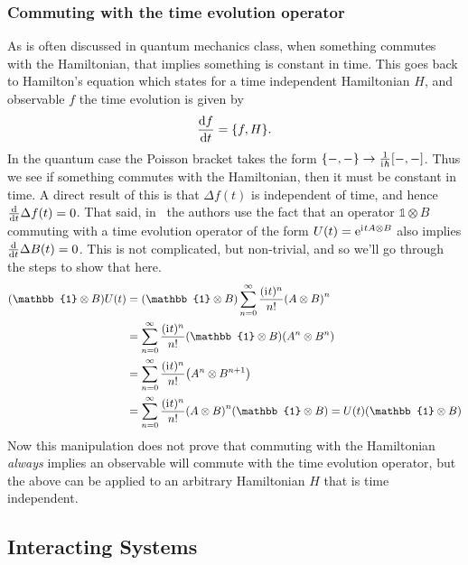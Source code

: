 \documentclass[11pt]{article}
\theoremstyle{definition}
\newcommand{\iu}{\mathrm{i}\mkern1mu}
\newcommand{\e}{\mathrm{e}}
\begin{document}
\subsubsection{Commuting with the time evolution operator}
As is often discussed in quantum mechanics class, when something commutes with the Hamiltonian, that implies something is constant in time. This goes back to Hamilton's equation which states for a time independent Hamiltonian $H$, and observable $f$ the time evolution is given by
\begin{equation*}
	\dv{f}{t} = \pb{f}{H}.
\end{equation*}
In the quantum case the Poisson bracket takes the form $\pb{-}{-}\to\frac{1}{\iu\hbar}\comm{-}{-}$. Thus we see if something commutes with the Hamiltonian, then it must be constant in time. A direct result of this is that $\Delta f(t)$ is independent of time, and hence $\dv{t}\Delta f(t) = 0$. That said, in~\cite{dynamic-entropies} the authors use the fact that an operator $\mathbb{1}\otimes B$ commuting with a time evolution operator of the form $U(t) = \e^{\iu t A\otimes B}$ also implies $\dv{t}\Delta B(t) = 0$. This is not complicated, but non-trivial, and so we'll go through the steps to show that here.
\begin{align*}
	\qty(\mathbb{1}\otimes B)U(t) & = \qty(\mathbb{1}\otimes B)\sum_{n = 0}^\infty\frac{(\iu t)^n}{n!}\qty(A\otimes B)^n                                  \\
	                              & = \sum_{n = 0}^\infty\frac{(\iu t)^n}{n!}\qty(\mathbb{1}\otimes B)\qty(A^n\otimes B^n)                                \\
	                              & = \sum_{n = 0}^\infty\frac{(\iu t)^n}{n!}\qty(A^n\otimes B^{n+1})                                                     \\
	                              & = \sum_{n = 0}^\infty\frac{(\iu t)^n}{n!}\qty(A\otimes B)^n\qty(\mathbb{1}\otimes B)  = U(t)\qty(\mathbb{1}\otimes B)
\end{align*}
Now this manipulation does not prove that commuting with the Hamiltonian \emph{always} implies an observable will commute with the time evolution operator, but the above can be applied to an arbitrary Hamiltonian $H$ that is time independent.

\subsection{Interacting Systems}
\end{document}
